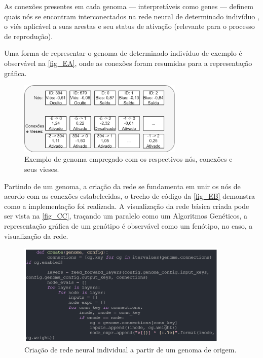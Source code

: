 As conexões presentes em cada genoma — interpretáveis como genes — definem quais nós se encontram interconectados na rede neural de determinado indivíduo
, o viés aplicável a suas arestas e seu status de ativação (relevante para o processo de reprodução).

Uma forma de representar o genoma de determinado indivíduo de exemplo é observável na \autoref{fig_EA}, onde as conexões foram resumidas para a representação gráfica.

\begin{figure}[htb]
        \centering
        \caption{\label{fig_EA}Exemplo de genoma empregado com os respectivos nós, conexões e seus vieses.}
        \includegraphics[width=0.7\textwidth]{images/EA.png}
\end{figure}

Partindo de um genoma, a criação da rede se fundamenta em unir os nós de acordo com as conexões estabelecidas,
o trecho de código da \autoref{fig_EB} demonstra como a implementação foi realizada. A visualização da rede básica
criada pode ser vista na \autoref{fig_CC}, traçando um paralelo como um Algoritmos Genéticos, a representação gráfica
de um genótipo é observável como um fenótipo, no caso, a visualização da rede.

\begin{figure}[htb]
        \centering
        \caption{\label{fig_EB}Criação de rede neural individual a partir de um genoma de origem.}
        \includegraphics[width=0.9\textwidth]{images/EB.png}
\end{figure}

